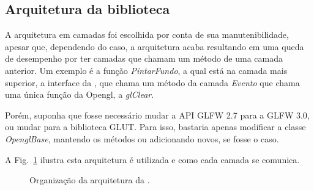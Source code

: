 \subsection{Arquitetura da biblioteca}
A arquitetura em camadas foi escolhida por conta de sua manutenibilidade, apesar que, dependendo do caso, a arquitetura acaba resultando em uma queda de desempenho por ter camadas que chamam um método de uma camada anterior. Um exemplo é a função \emph{PintarFundo}, a qual está na camada mais superior, a interface da \playAPC{}, que chama um método da camada \emph{Evento} que chama uma única função da Opengl, a \emph{glClear}.

Porém, suponha que fosse necessário mudar a API GLFW 2.7 para a GLFW 3.0, ou mudar para a biblioteca GLUT. Para isso, bastaria apenas modificar a classe \emph{OpenglBase}, mantendo os métodos ou adicionando novos, se fosse o caso. 

A Fig.~\ref{fig:arq} ilustra esta arquitetura é utilizada e como cada camada se comunica.

\begin{figure}[ht!]
\centering  %
\caption{Organização da arquitetura da \playAPC.}
\label{fig:arq}
\end{figure}

